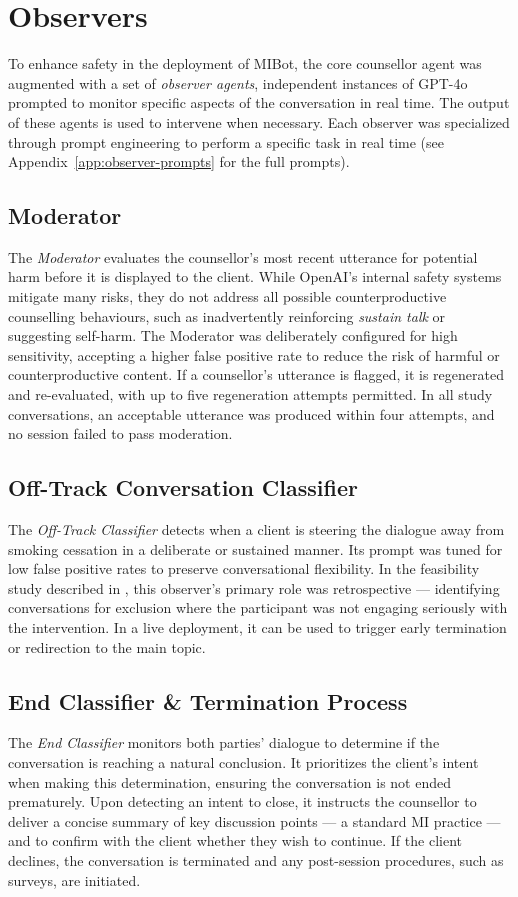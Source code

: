 \section{Observers}
\label{sec:observers}
To enhance safety in the deployment of MIBot, the core counsellor agent was augmented with a set of \textit{observer agents}, independent instances of GPT-4o prompted to monitor specific aspects of the conversation in real time. The output of these agents is used to intervene when necessary. Each observer was specialized through prompt engineering to perform a specific task in real time (see Appendix~\ref{app:observer-prompts} for the full prompts).

\subsection{Moderator}
The \textit{Moderator} evaluates the counsellor's most recent utterance for potential harm before it is displayed to the client. While OpenAI's internal safety systems mitigate many risks, they do not address all possible counterproductive counselling behaviours, such as inadvertently reinforcing \emph{sustain talk} or suggesting self-harm. The Moderator was deliberately configured for high sensitivity, accepting a higher false positive rate to reduce the risk of harmful or counterproductive content. If a counsellor's utterance is flagged, it is regenerated and re-evaluated, with up to five regeneration attempts permitted. In all study conversations, an acceptable utterance was produced within four attempts, and no session failed to pass moderation.

\subsection{Off-Track Conversation Classifier}
The \textit{Off-Track Classifier} detects when a client is steering the dialogue away from smoking cessation in a deliberate or sustained manner. Its prompt was tuned for low false positive rates to preserve conversational flexibility. In the feasibility study described in , this observer's primary role was retrospective --- identifying conversations for exclusion where the participant was not engaging seriously with the intervention. In a live deployment, it can be used to trigger early termination or redirection to the main topic.

\subsection{End Classifier \& Termination Process}
The \textit{End Classifier} monitors both parties' dialogue to determine if the conversation is reaching a natural conclusion. It prioritizes the client's intent when making this determination, ensuring the conversation is not ended prematurely. Upon detecting an intent to close, it instructs the counsellor to deliver a concise summary of key discussion points --- a standard MI practice --- and to confirm with the client whether they wish to continue. If the client declines, the conversation is terminated and any post-session procedures, such as surveys, are initiated.


